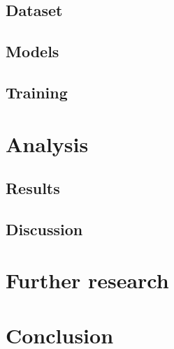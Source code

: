 \documentclass{article}
\begin{document}
\subsection{Dataset}\label{sec:dataset}


\subsection{Models}\label{sec:models}


\subsection{Training}\label{sec:training}


\section{Analysis}\label{sec:analysis}


\subsection{Results}\label{sec:results}


\subsection{Discussion}\label{sec:discussion}


\section{Further research}\label{sec:furtherResearch}


\section{Conclusion}\label{sec:conclusion}


\printbibliography%
\end{document}
